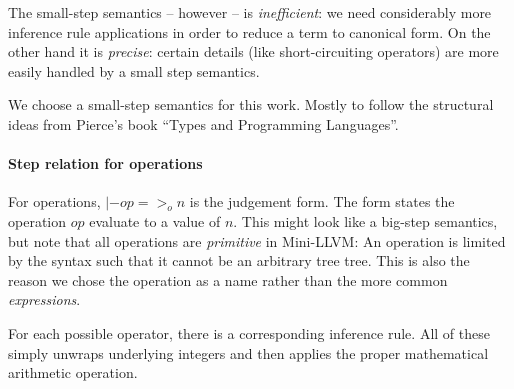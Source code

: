 \documentclass[a4paper, oneside, 10pt, draft]{memoir}
\begin{document}
The small-step semantics -- however -- is \emph{inefficient}: we need
considerably more inference rule applications in order to reduce a
term to canonical form. On the other hand it is \emph{precise}:
certain details (like short-circuiting operators) are more easily
handled by a small step semantics.

We choose a small-step semantics for this work. Mostly to follow the
structural ideas from Pierce's book ``Types and Programming
Languages''.

\paragraph{Step relation for operations}

\newcommand{\eop}{=>_{o}} For operations, $\boxed{|- op \eop n}$ is
the judgement form. The form states the operation $op$ evaluate to a
value of $n$. This might look like a big-step semantics, but note that
all operations are \emph{primitive} in Mini-LLVM: An operation is
limited by the syntax such that it cannot be an arbitrary tree
tree. This is also the reason we chose the operation as a name rather
than the more common \emph{expressions}.

For each possible operator, there is a corresponding inference
rule. All of these simply unwraps underlying integers and then applies
the proper mathematical arithmetic operation.
\end{document}
